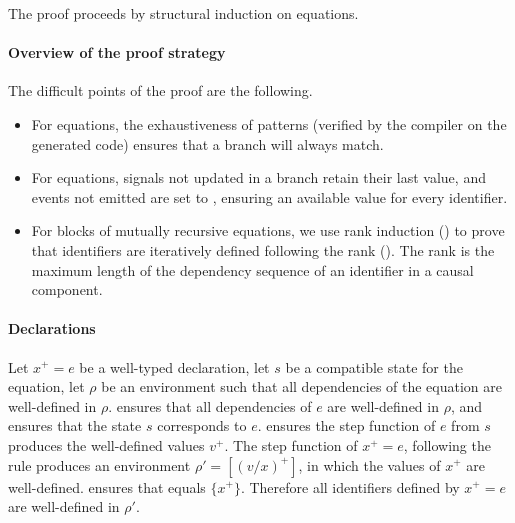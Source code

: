\begin{skippableproof}
    The proof proceeds by structural induction on equations.

    \paragraph{Overview of the proof strategy}
    The difficult points of the proof are the following.
    \begin{itemize}
        \item For  equations, the exhaustiveness of patterns (verified by the \Rust
              compiler on the generated code) ensures that a branch will always match.
        \item For  equations, signals not updated in a branch retain their last value, and
              events not emitted are set to \none, ensuring an available value for every identifier.
        \item For blocks of mutually recursive equations, we use rank induction
              () to prove that
              identifiers are iteratively defined following the rank ().
              The rank is the maximum length of the dependency sequence of an identifier in a causal
              component.
    \end{itemize}

    \paragraph{Declarations}
    Let $x^+ = e$ be a well-typed declaration, let $s$ be a compatible state for the equation, let
    $\rho$ be an environment such that all dependencies of the equation are well-defined in $\rho$.
     ensures that all dependencies
    of $e$ are well-defined in $\rho$, and  ensures
    that the state $s$ corresponds to $e$.
     ensures the step function of $e$ from $s$
    produces the well-defined values $v^+$. The step function of $x^+ = e$, following the rule
     produces an environment $\rho' =
        [(v / x)^+]$, in which the values of $x^+$ are well-defined.  ensures that  equals $\{ x^+ \}$. Therefore all
    identifiers defined by $x^+ = e$ are well-defined in $\rho'$.


\end{skippableproof}
